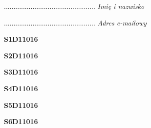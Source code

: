 \begin{turn}{90}\begin{minipage}{\linewidth} \vspace{20mm} ................................................  \textit{Imię i nazwisko}\end{minipage}\end{turn}

\begin{turn}{90}\begin{minipage}{\linewidth} \vspace{20mm} ................................................  \textit{Adres e-mailowy}\end{minipage}\end{turn}

\begin{turn}{90}\huge \begin{minipage}{\linewidth} \vspace{10mm}\textbf{S1D11016}\end{minipage}\end{turn}

\begin{turn}{90}\huge \begin{minipage}{\linewidth} \vspace{10mm}\textbf{S2D11016}\end{minipage}\end{turn}

\begin{turn}{90}\huge \begin{minipage}{\linewidth} \vspace{10mm}\textbf{S3D11016}\end{minipage}\end{turn}

\begin{turn}{90}\huge \begin{minipage}{\linewidth} \vspace{10mm}\textbf{S4D11016}\end{minipage}\end{turn}

\begin{turn}{90}\huge \begin{minipage}{\linewidth} \vspace{10mm}\textbf{S5D11016}\end{minipage}\end{turn}

\begin{turn}{90}\huge \begin{minipage}{\linewidth} \vspace{10mm}\textbf{S6D11016}\end{minipage}\end{turn}

